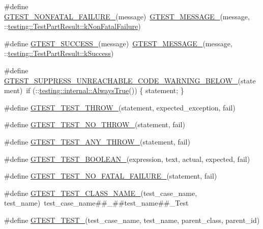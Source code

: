 \begin{DoxyCompactItemize}
\item 
\#define \hyperlink{gtest-internal_8h_a6cb7482cfa03661a91c698eb5895f642}{\-G\-T\-E\-S\-T\-\_\-\-N\-O\-N\-F\-A\-T\-A\-L\-\_\-\-F\-A\-I\-L\-U\-R\-E\-\_\-}(message)~\hyperlink{gtest-internal_8h_a94c73d5368ec946bc354d0992ad00810}{\-G\-T\-E\-S\-T\-\_\-\-M\-E\-S\-S\-A\-G\-E\-\_\-}(message, \-::\hyperlink{classtesting_1_1TestPartResult_a1d1cfd8ffb84e947f82999c682b666a7af063e8ea6a2c3b8bdccc62a49e1e27a7}{testing\-::\-Test\-Part\-Result\-::k\-Non\-Fatal\-Failure})
\item 
\#define \hyperlink{gtest-internal_8h_abe012b550eb3807e8c49f7e161bd1567}{\-G\-T\-E\-S\-T\-\_\-\-S\-U\-C\-C\-E\-S\-S\-\_\-}(message)~\hyperlink{gtest-internal_8h_a94c73d5368ec946bc354d0992ad00810}{\-G\-T\-E\-S\-T\-\_\-\-M\-E\-S\-S\-A\-G\-E\-\_\-}(message, \-::\hyperlink{classtesting_1_1TestPartResult_a1d1cfd8ffb84e947f82999c682b666a7a266017ca395108407d14b7be595574c1}{testing\-::\-Test\-Part\-Result\-::k\-Success})
\item 
\#define \hyperlink{gtest-internal_8h_a2e66f7dfc5cb87e0fa0289f653173c69}{\-G\-T\-E\-S\-T\-\_\-\-S\-U\-P\-P\-R\-E\-S\-S\-\_\-\-U\-N\-R\-E\-A\-C\-H\-A\-B\-L\-E\-\_\-\-C\-O\-D\-E\-\_\-\-W\-A\-R\-N\-I\-N\-G\-\_\-\-B\-E\-L\-O\-W\-\_\-}(statement)~if (\-::\hyperlink{namespacetesting_1_1internal_a7b125f3952e08530aedb98a650ee73c1}{testing\-::internal\-::\-Always\-True}()) \{ statement; \}
\item 
\#define \hyperlink{gtest-internal_8h_a3f71db93eaf30b0cfca9612b9ac32106}{\-G\-T\-E\-S\-T\-\_\-\-T\-E\-S\-T\-\_\-\-T\-H\-R\-O\-W\-\_\-}(statement, expected\-\_\-exception, fail)
\item 
\#define \hyperlink{gtest-internal_8h_a9a109d026b5a904646437d7570e13581}{\-G\-T\-E\-S\-T\-\_\-\-T\-E\-S\-T\-\_\-\-N\-O\-\_\-\-T\-H\-R\-O\-W\-\_\-}(statement, fail)
\item 
\#define \hyperlink{gtest-internal_8h_af48bbd26d54d4afc5e4cef39b1c76ba3}{\-G\-T\-E\-S\-T\-\_\-\-T\-E\-S\-T\-\_\-\-A\-N\-Y\-\_\-\-T\-H\-R\-O\-W\-\_\-}(statement, fail)
\item 
\#define \hyperlink{gtest-internal_8h_ae8912365e1d00a7a2bd248268c64aa1a}{\-G\-T\-E\-S\-T\-\_\-\-T\-E\-S\-T\-\_\-\-B\-O\-O\-L\-E\-A\-N\-\_\-}(expression, text, actual, expected, fail)
\item 
\#define \hyperlink{gtest-internal_8h_a1b37a3c446836d33040f3266a6236081}{\-G\-T\-E\-S\-T\-\_\-\-T\-E\-S\-T\-\_\-\-N\-O\-\_\-\-F\-A\-T\-A\-L\-\_\-\-F\-A\-I\-L\-U\-R\-E\-\_\-}(statement, fail)
\item 
\#define \hyperlink{gtest-internal_8h_a87a1ee3a3b9b798195236d053f2e5dcc}{\-G\-T\-E\-S\-T\-\_\-\-T\-E\-S\-T\-\_\-\-C\-L\-A\-S\-S\-\_\-\-N\-A\-M\-E\-\_\-}(test\-\_\-case\-\_\-name, test\-\_\-name)~test\-\_\-case\-\_\-name\#\#\-\_\-\#\#test\-\_\-name\#\#\-\_\-\-Test
\item 
\#define \hyperlink{gtest-internal_8h_ae2d26f0f92fbaf62bf4c1eca45bb2f1f}{\-G\-T\-E\-S\-T\-\_\-\-T\-E\-S\-T\-\_\-}(test\-\_\-case\-\_\-name, test\-\_\-name, parent\-\_\-class, parent\-\_\-id)
\end{DoxyCompactItemize}
